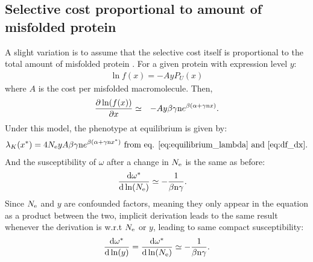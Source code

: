 \documentclass{article}
\begin{document}
\subsection{Selective cost proportional to amount of misfolded protein}
A slight variation is to assume that the selective cost itself is proportional to the total amount of misfolded protein  \citep{Drummond2005a, Wilke2006, Drummond2008, Serohijos2012}. For a given protein with expression level $y$:
\begin{eqnarray}
\ln f(x) = - A y P_{U} (x)
\end{eqnarray}
where $A$ is the cost per misfolded macromolecule. Then, 
\begin{eqnarray}
\frac{\partial \ln (f(x))}{\partial x} &\simeq& -A y \beta \gamma \text{n} e^{\beta(\alpha + \gamma \text{n} x)}.
\end{eqnarray}
Under this model, the phenotype at equilibrium is given by:
\begin{eqnarray}
\lambda_{K}(x^{*}) = 4N_{\mathrm{e}} y A \beta \gamma \text{n} e^{\beta(\alpha + \gamma \text{n} x^{*})} \text{ from eq. \ref{eq:equilibrium_lambda} and \ref{eq:df_dx}}.
\end{eqnarray}
And the susceptibility of $\omega$ after a change in $N_{\mathrm{e}}$ is the same as before:
\begin{align}
\frac{ \mathrm{d} \omega^{*}}{\mathrm{d} \ln (N_{\mathrm{e}})} & \simeq - \frac{1}{\beta \text{n} \gamma}.
\end{align}
Since $N_{\mathrm{e}}$ and $y$ are confounded factors, meaning they only appear in the equation as a product between the two, implicit derivation leads to the same result whenever the derivation is w.r.t $N_{\mathrm{e}}$ or $y$, leading to same compact susceptibility:
\begin{eqnarray}
\frac{ \mathrm{d} \omega^{*}}{\mathrm{d} \ln (y)} = \frac{ \mathrm{d} \omega^{*}}{\mathrm{d} \ln (N_{\mathrm{e}})} \simeq - \frac{1}{\beta \text{n} \gamma}.
\end{eqnarray}
\end{document}
